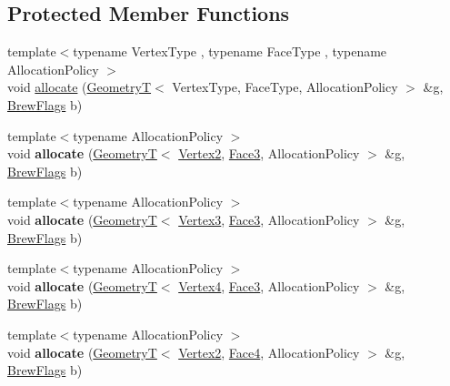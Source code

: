 \subsection*{\-Protected \-Member \-Functions}
\begin{DoxyCompactItemize}
\item 
{\footnotesize template$<$typename Vertex\-Type , typename Face\-Type , typename Allocation\-Policy $>$ }\\void \hyperlink{classs9_1_1gl_1_1Drawable_ad9c83ff9377dfd128a32e2bb005d257f}{allocate} (\hyperlink{classs9_1_1GeometryT}{\-Geometry\-T}$<$ \-Vertex\-Type, \-Face\-Type, \-Allocation\-Policy $>$ \&g, \hyperlink{structs9_1_1gl_1_1BrewFlags}{\-Brew\-Flags} b)
\item 
\hypertarget{classs9_1_1gl_1_1Drawable_a262ce388ff43ede822f61c96272c7747}{{\footnotesize template$<$typename Allocation\-Policy $>$ }\\void {\bfseries allocate} (\hyperlink{classs9_1_1GeometryT}{\-Geometry\-T}$<$ \hyperlink{structs9_1_1VertexT}{\-Vertex2}, \hyperlink{structs9_1_1FaceT}{\-Face3}, \-Allocation\-Policy $>$ \&g, \hyperlink{structs9_1_1gl_1_1BrewFlags}{\-Brew\-Flags} b)}\label{classs9_1_1gl_1_1Drawable_a262ce388ff43ede822f61c96272c7747}

\item 
\hypertarget{classs9_1_1gl_1_1Drawable_a4489c6f70638b5d75558349225cd43a8}{{\footnotesize template$<$typename Allocation\-Policy $>$ }\\void {\bfseries allocate} (\hyperlink{classs9_1_1GeometryT}{\-Geometry\-T}$<$ \hyperlink{structs9_1_1VertexT}{\-Vertex3}, \hyperlink{structs9_1_1FaceT}{\-Face3}, \-Allocation\-Policy $>$ \&g, \hyperlink{structs9_1_1gl_1_1BrewFlags}{\-Brew\-Flags} b)}\label{classs9_1_1gl_1_1Drawable_a4489c6f70638b5d75558349225cd43a8}

\item 
\hypertarget{classs9_1_1gl_1_1Drawable_a17ad8176a4295ec65e12ef4bb316581a}{{\footnotesize template$<$typename Allocation\-Policy $>$ }\\void {\bfseries allocate} (\hyperlink{classs9_1_1GeometryT}{\-Geometry\-T}$<$ \hyperlink{structs9_1_1VertexT}{\-Vertex4}, \hyperlink{structs9_1_1FaceT}{\-Face3}, \-Allocation\-Policy $>$ \&g, \hyperlink{structs9_1_1gl_1_1BrewFlags}{\-Brew\-Flags} b)}\label{classs9_1_1gl_1_1Drawable_a17ad8176a4295ec65e12ef4bb316581a}

\item 
\hypertarget{classs9_1_1gl_1_1Drawable_ac984e096084672fd0ffcef1560ab8b11}{{\footnotesize template$<$typename Allocation\-Policy $>$ }\\void {\bfseries allocate} (\hyperlink{classs9_1_1GeometryT}{\-Geometry\-T}$<$ \hyperlink{structs9_1_1VertexT}{\-Vertex2}, \hyperlink{structs9_1_1FaceT}{\-Face4}, \-Allocation\-Policy $>$ \&g, \hyperlink{structs9_1_1gl_1_1BrewFlags}{\-Brew\-Flags} b)}\label{classs9_1_1gl_1_1Drawable_ac984e096084672fd0ffcef1560ab8b11}


\end{DoxyCompactItemize}
